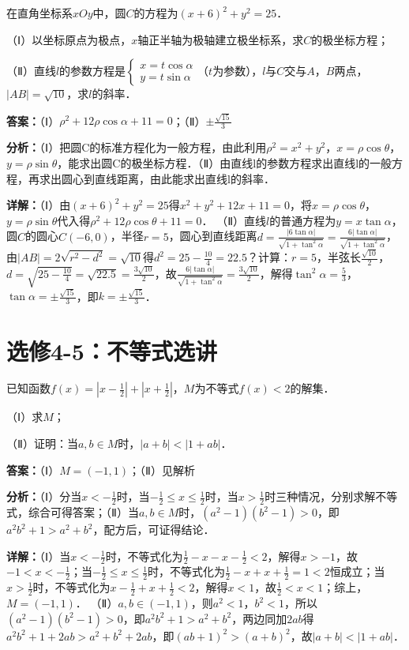 \begin{question}[points=10]
在直角坐标系$xOy$中，圆$C$的方程为$(x+6)^2+y^2=25$．

（Ⅰ）以坐标原点为极点，$x$轴正半轴为极轴建立极坐标系，求$C$的极坐标方程；

（Ⅱ）直线$l$的参数方程是$\begin{cases} x=t\cos\alpha \\ y=t\sin\alpha \end{cases}$（$t$为参数），$l$与$C$交与$A$，$B$两点，$|AB|=\sqrt{10}$，求$l$的斜率．
\begin{solution}
\textbf{答案：}（Ⅰ）$\rho^2+12\rho\cos\alpha+11=0$；（Ⅱ）$\pm\frac{\sqrt{15}}{3}$

\textbf{分析：}（Ⅰ）把圆C的标准方程化为一般方程，由此利用$\rho^2=x^2+y^2$，$x=\rho\cos\theta$，$y=\rho\sin\theta$，能求出圆C的极坐标方程．（Ⅱ）由直线l的参数方程求出直线l的一般方程，再求出圆心到直线距离，由此能求出直线l的斜率．

\textbf{详解：}（Ⅰ）由$(x+6)^2+y^2=25$得$x^2+y^2+12x+11=0$，将$x=\rho\cos\theta$，$y=\rho\sin\theta$代入得$\rho^2+12\rho\cos\theta+11=0$．
（Ⅱ）直线$l$的普通方程为$y=x\tan\alpha$，圆$C$的圆心$C(-6,0)$，半径$r=5$，圆心到直线距离$d=\frac{|6\tan\alpha|}{\sqrt{1+\tan^2\alpha}}=\frac{6|\tan\alpha|}{\sqrt{1+\tan^2\alpha}}$，由$|AB|=2\sqrt{r^2-d^2}=\sqrt{10}$得$d^2=25-\frac{10}{4}=22.5$？计算：$r=5$，半弦长$\frac{\sqrt{10}}{2}$，$d=\sqrt{25-\frac{10}{4}}=\sqrt{22.5}=\frac{3\sqrt{10}}{2}$，故$\frac{6|\tan\alpha|}{\sqrt{1+\tan^2\alpha}}=\frac{3\sqrt{10}}{2}$，解得$\tan^2\alpha=\frac{5}{3}$，$\tan\alpha=\pm\frac{\sqrt{15}}{3}$，即$k=\pm\frac{\sqrt{15}}{3}$．
\end{solution}
\end{question}

\section*{选修4-5：不等式选讲}

\begin{question}[points=10]
已知函数$f(x)=|x-\frac12|+|x+\frac12|$，$M$为不等式$f(x)<2$的解集．

（Ⅰ）求$M$；

（Ⅱ）证明：当$a,b\in M$时，$|a+b|<|1+ab|$．
\begin{solution}
\textbf{答案：}（Ⅰ）$M=(-1,1)$；（Ⅱ）见解析

\textbf{分析：}（Ⅰ）分当$x<-\frac12$时，当$-\frac12\le x\le \frac12$时，当$x>\frac12$时三种情况，分别求解不等式，综合可得答案；（Ⅱ）当$a,b\in M$时，$(a^2-1)(b^2-1)>0$，即$a^2b^2+1>a^2+b^2$，配方后，可证得结论．

\textbf{详解：}（Ⅰ）当$x<-\frac12$时，不等式化为$\frac12-x-x-\frac12<2$，解得$x>-1$，故$-1<x<-\frac12$；当$-\frac12\le x\le \frac12$时，不等式化为$\frac12-x+x+\frac12=1<2$恒成立；当$x>\frac12$时，不等式化为$x-\frac12+x+\frac12<2$，解得$x<1$，故$\frac12<x<1$；综上，$M=(-1,1)$．
（Ⅱ）$a,b\in(-1,1)$，则$a^2<1$，$b^2<1$，所以$(a^2-1)(b^2-1)>0$，即$a^2b^2+1>a^2+b^2$，两边同加$2ab$得$a^2b^2+1+2ab>a^2+b^2+2ab$，即$(ab+1)^2>(a+b)^2$，故$|a+b|<|1+ab|$．
\end{solution}
\end{question}

